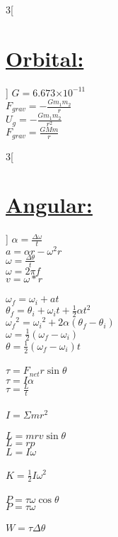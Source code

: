 \documentclass{article}[16pt]
\providecommand{\e}[1]{\ensuremath{\times 10^{#1}}}
\begin{document}
\begin{multicols}{3}[\section*{\underline {Orbital:}}]
$G = 6.673\e{-11}$\\
$F_{grav} = -\frac{Gm_1m_2}{r}$\\
$U_g = -\frac{Gm_1m_2}{r^2}$\\
$F_{grav} = \frac{GMm}{r}$\\
\end{multicols}
\begin{multicols}{3}[\section*{\underline {Angular:}}]
$\alpha = \frac{\Delta\omega}{t}$\\
$a = \alpha r-\omega^2 r$\\
$\omega = \frac{\Delta\theta}{t}$\\
$\omega = 2 \pi f$\\
$v = \omega * r$\\
\\
$\omega_f = \omega_i + at$\\
$\theta_f = \theta_i + \omega_it + \frac{1}{2}\alpha t^2$\\
${\omega_f}^2 = {\omega_i}^2 + 2\alpha(\theta_f-\theta_i)$\\
$\omega = \frac{1}{2}(\omega_f-\omega_i)$\\
$\theta = \frac{1}{2}(\omega_f-\omega_i)t$\\
\\
$\tau = F_{net}r\sin\theta$\\
$\tau =  I\alpha$\\
$\tau = \frac{L}{t}$\\
\\
$I = \Sigma mr^2$\\
\\
$L = mrv\sin\theta$\\
$L = rp$\\
$L = I\omega$\\
\\
$K = \frac{1}{2}I\omega^2$\\
\\
$P = \tau\omega\cos\theta$\\
$P = \tau\omega$\\
\\
$W = \tau\Delta\theta$\\
\end{multicols}
\end{document}
